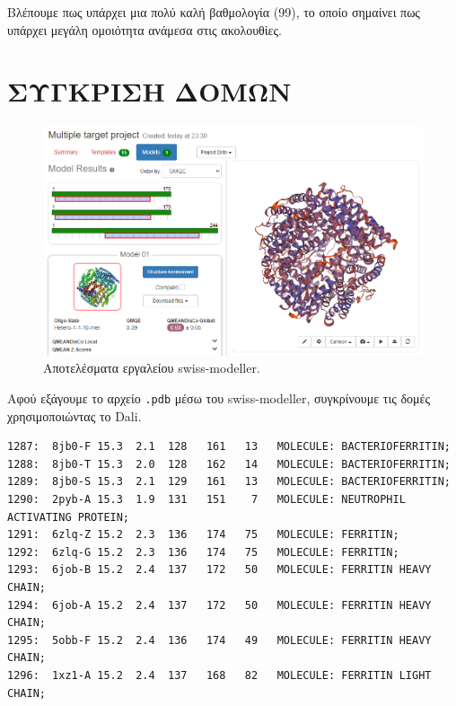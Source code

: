         Βλέπουμε πως υπάρχει μια πολύ καλή βαθμολογία (99), το οποίο σημαίνει πως υπάρχει μεγάλη ομοιότητα ανάμεσα στις ακολουθίες.

    \section{ΣΥΓΚΡΙΣΗ ΔΟΜΩΝ}

        \begin{figure}[H] \noindent \centering
            \includegraphics[scale=0.8]{img/swiss-modeller}
            \caption{Αποτελέσματα εργαλείου swiss-modeller.}
        \end{figure}

    Αφού εξάγουμε το αρχείο \texttt{.pdb} μέσω του swiss-modeller, συγκρίνουμε τις δομές χρησιμοποιώντας το Dali.

    \begin{graycomment} \footnotesize
    \begin{verbatim}
1287:  8jb0-F 15.3  2.1  128   161   13   MOLECULE: BACTERIOFERRITIN;
1288:  8jb0-T 15.3  2.0  128   162   14   MOLECULE: BACTERIOFERRITIN;
1289:  8jb0-S 15.3  2.1  129   161   13   MOLECULE: BACTERIOFERRITIN;
1290:  2pyb-A 15.3  1.9  131   151    7   MOLECULE: NEUTROPHIL ACTIVATING PROTEIN;
1291:  6zlq-Z 15.2  2.3  136   174   75   MOLECULE: FERRITIN;
1292:  6zlq-G 15.2  2.3  136   174   75   MOLECULE: FERRITIN;
1293:  6job-B 15.2  2.4  137   172   50   MOLECULE: FERRITIN HEAVY CHAIN;
1294:  6job-A 15.2  2.4  137   172   50   MOLECULE: FERRITIN HEAVY CHAIN;
1295:  5obb-F 15.2  2.4  136   174   49   MOLECULE: FERRITIN HEAVY CHAIN;
1296:  1xz1-A 15.2  2.4  137   168   82   MOLECULE: FERRITIN LIGHT CHAIN;\end{verbatim}
    \end{graycomment}